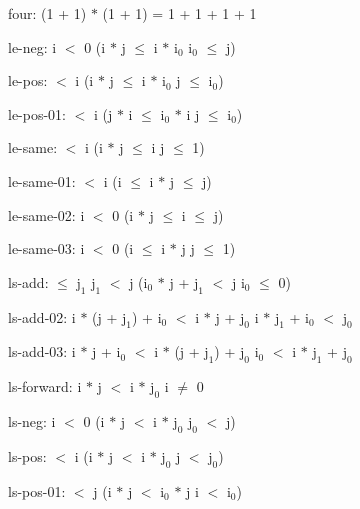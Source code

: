 \documentclass[a4paper]{article}
\begin{document}
\item	four:  \Fol (1 + 1) $*$ (1 + 1) = 1 + 1 + 1 + 1

\item	le-neg:  \Fol i $<$ 0 \Imp (i $*$ j $\le$ i $*$ $\mbox{i}_{0}$ \Equiv $\mbox{i}_{0}$ $\le$ j)

\item	le-pos:   $<$ i \Imp (i $*$ j $\le$ i $*$ $\mbox{i}_{0}$ \Equiv j $\le$ $\mbox{i}_{0}$)

\item	le-pos-01:   $<$ i \Imp (j $*$ i $\le$ $\mbox{i}_{0}$ $*$ i \Equiv j $\le$ $\mbox{i}_{0}$)

\item	le-same:   $<$ i \Imp (i $*$ j $\le$ i \Equiv j $\le$ 1)

\item	le-same-01:   $<$ i \Imp (i $\le$ i $*$ j  $\le$ j)

\item	le-same-02:  \Fol i $<$ 0 \Imp (i $*$ j $\le$ i  $\le$ j)

\item	le-same-03:  \Fol i $<$ 0 \Imp (i $\le$ i $*$ j \Equiv j $\le$ 1)

\item	ls-add:   $\le$ $\mbox{j}_{1}$ \And $\mbox{j}_{1}$ $<$ j \Imp ($\mbox{i}_{0}$ $*$ j + $\mbox{j}_{1}$ $<$ j \Equiv $\mbox{i}_{0}$ $\le$ 0)

\item	ls-add-02:  \Fol i $*$ (j + $\mbox{j}_{1}$) + $\mbox{i}_{0}$ $<$ i $*$ j + $\mbox{j}_{0}$ \Equiv i $*$ $\mbox{j}_{1}$ + $\mbox{i}_{0}$ $<$ $\mbox{j}_{0}$

\item	ls-add-03:  \Fol i $*$ j + $\mbox{i}_{0}$ $<$ i $*$ (j + $\mbox{j}_{1}$) + $\mbox{j}_{0}$ \Equiv $\mbox{i}_{0}$ $<$ i $*$ $\mbox{j}_{1}$ + $\mbox{j}_{0}$

\item	ls-forward:  \Fol i $*$ j $<$ i $*$ $\mbox{j}_{0}$ \Imp i $\neq$ 0

\item	ls-neg:  \Fol i $<$ 0 \Imp (i $*$ j $<$ i $*$ $\mbox{j}_{0}$ \Equiv $\mbox{j}_{0}$ $<$ j)

\item	ls-pos:   $<$ i \Imp (i $*$ j $<$ i $*$ $\mbox{j}_{0}$ \Equiv j $<$ $\mbox{j}_{0}$)

\item	ls-pos-01:   $<$ j \Imp (i $*$ j $<$ $\mbox{i}_{0}$ $*$ j \Equiv i $<$ $\mbox{i}_{0}$)
\end{document}
